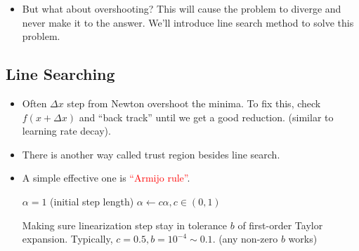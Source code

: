 \begin{itemize}
    Now we can always find local minima.

    \item But what about overshooting?  This will cause the problem to diverge and never make it to the answer. We'll introduce line search method to solve this problem.
\end{itemize}
\subsection{Line Searching}
\begin{itemize}
    \item Often $\Delta x$ step from Newton overshoot the minima. To fix this, check $f(x+\Delta x)$ and ``back track'' until we get a good reduction. (similar to learning rate decay).
    \item There is another way called trust region besides line search.
    \item A simple effective one is \textcolor{red}{``Armijo rule''}.
    \begin{algorithmic}[1]
        \STATE $\alpha=1$ (initial step length)
          \STATE $\alpha\leftarrow c\alpha, c\in(0,1)$
        \ENDWHILE
    \end{algorithmic}
    Making sure linearization step stay in tolerance $b$ of first-order Taylor expansion. Typically, $c=0.5,b=10^{-4}\sim0.1$. (any non-zero $b$ works)


\end{itemize}
